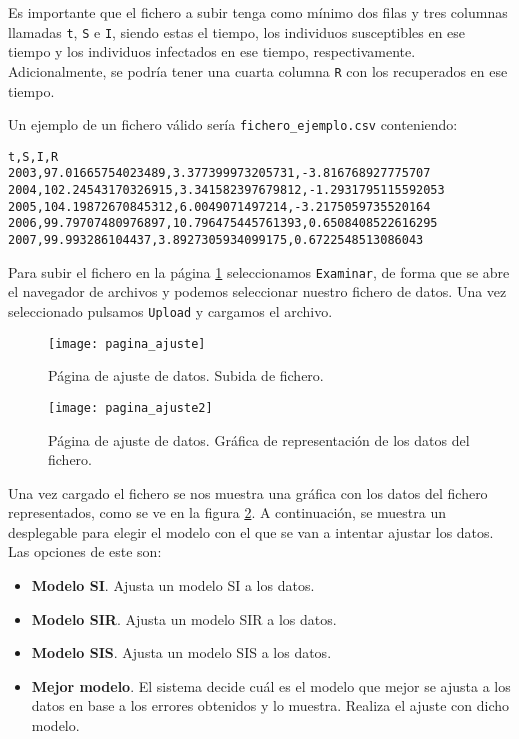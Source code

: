 Es importante que el fichero a subir tenga como mínimo dos filas y tres columnas llamadas \verb|t|, \verb|S| e \verb|I|, siendo estas el tiempo, los individuos susceptibles en ese tiempo y los individuos infectados en ese tiempo, respectivamente. Adicionalmente, se podría tener una cuarta columna \verb|R| con los recuperados en ese tiempo.

Un ejemplo de un fichero válido sería \verb|fichero_ejemplo.csv| conteniendo:

\begin{verbatim}
t,S,I,R
2003,97.01665754023489,3.377399973205731,-3.816768927775707
2004,102.24543170326915,3.341582397679812,-1.2931795115592053
2005,104.19872670845312,6.0049071497214,-3.2175059735520164
2006,99.79707480976897,10.796475445761393,0.6508408522616295
2007,99.993286104437,3.8927305934099175,0.6722548513086043
\end{verbatim}

Para subir el fichero en la página \ref{manual: ajuste1} seleccionamos \verb|Examinar|, de forma que se abre el navegador de archivos y podemos seleccionar nuestro fichero de datos. Una vez seleccionado pulsamos \verb|Upload| y cargamos el archivo.

\begin{figure}
\begin{center}
\caption{Página de ajuste de datos. Subida de fichero.}
\label{manual: ajuste1}
\texttt{[image: pagina\_ajuste]}
\end{center}
\end{figure}

\begin{figure}
\begin{center}
\caption{Página de ajuste de datos. Gráfica de representación de los datos del fichero.}
\label{manual: ajuste2}
\texttt{[image: pagina\_ajuste2]}
\end{center}
\end{figure}

Una vez cargado el fichero se nos muestra una gráfica con los datos del fichero representados, como se ve en la figura \ref{manual: ajuste2}. A continuación, se muestra un desplegable para elegir el modelo con el que se van a intentar ajustar los datos. Las opciones de este son:

\begin{itemize}
\item \textbf{Modelo SI}. Ajusta un modelo SI a los datos.
\item \textbf{Modelo SIR}. Ajusta un modelo SIR a los datos.
\item \textbf{Modelo SIS}. Ajusta un modelo SIS a los datos.
\item \textbf{Mejor modelo}. El sistema decide cuál es el modelo que mejor se ajusta a los datos en base a los errores obtenidos y lo muestra. Realiza el ajuste con dicho modelo.
\end{itemize}

